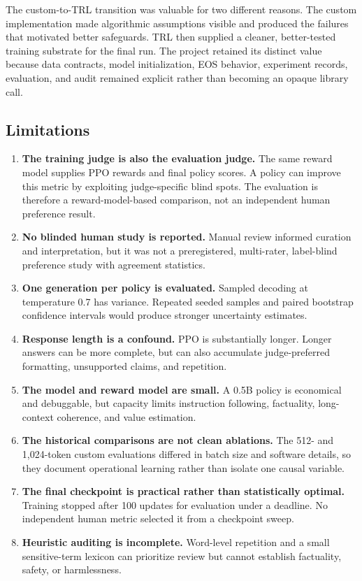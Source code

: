 \documentclass[11pt]{article}
\newcommand{\trl}{\textsc{TRL}}
\begin{document}
The custom-to-\trl{} transition was valuable for two different reasons. The
custom implementation made algorithmic assumptions visible and produced the
failures that motivated better safeguards. \trl{} then supplied a cleaner,
better-tested training substrate for the final run. The project retained its
distinct value because data contracts, model initialization, EOS behavior,
experiment records, evaluation, and audit remained explicit rather than
becoming an opaque library call.

\subsection{Limitations}

\begin{enumerate}
  \item \textbf{The training judge is also the evaluation judge.} The same
  reward model supplies PPO rewards and final policy scores. A policy can
  improve this metric by exploiting judge-specific blind spots. The evaluation
  is therefore a reward-model-based comparison, not an independent human
  preference result.
  \item \textbf{No blinded human study is reported.} Manual review informed
  curation and interpretation, but it was not a preregistered, multi-rater,
  label-blind preference study with agreement statistics.
  \item \textbf{One generation per policy is evaluated.} Sampled decoding at
  temperature 0.7 has variance. Repeated seeded samples and paired bootstrap
  confidence intervals would produce stronger uncertainty estimates.
  \item \textbf{Response length is a confound.} PPO is substantially longer.
  Longer answers can be more complete, but can also accumulate judge-preferred
  formatting, unsupported claims, and repetition.
  \item \textbf{The model and reward model are small.} A 0.5B policy is
  economical and debuggable, but capacity limits instruction following,
  factuality, long-context coherence, and value estimation.
  \item \textbf{The historical comparisons are not clean ablations.} The
  512- and 1,024-token custom evaluations differed in batch size and software
  details, so they document operational learning rather than isolate one
  causal variable.
  \item \textbf{The final checkpoint is practical rather than statistically
  optimal.} Training stopped after 100 updates for evaluation under a deadline.
  No independent human metric selected it from a checkpoint sweep.
  \item \textbf{Heuristic auditing is incomplete.} Word-level repetition and a
  small sensitive-term lexicon can prioritize review but cannot establish
  factuality, safety, or harmlessness.
\end{enumerate}
\end{document}
